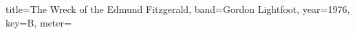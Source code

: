 \documentclass{skrul-leadsheet}
\begin{document}
\begin{song}[transpose-capo=true]{title={The Wreck of the Edmund Fitzgerald}, band={Gordon Lightfoot}, year={1976}, key={B}, meter={}}



\end{song}
\end{document}
